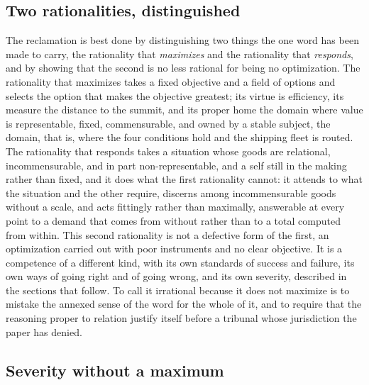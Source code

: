\subsection*{Two rationalities, distinguished}

The reclamation is best done by distinguishing two things the one word has been made to carry, the rationality that \emph{maximizes} and the rationality that \emph{responds}, and by showing that the second is no less rational for being no optimization. The rationality that maximizes takes a fixed objective and a field of options and selects the option that makes the objective greatest; its virtue is efficiency, its measure the distance to the summit, and its proper home the domain where value is representable, fixed, commensurable, and owned by a stable subject, the domain, that is, where the four conditions hold and the shipping fleet is routed. The rationality that responds takes a situation whose goods are relational, incommensurable, and in part non-representable, and a self still in the making rather than fixed, and it does what the first rationality cannot: it attends to what the situation and the other require, discerns among incommensurable goods without a scale, and acts fittingly rather than maximally, answerable at every point to a demand that comes from without rather than to a total computed from within. This second rationality is not a defective form of the first, an optimization carried out with poor instruments and no clear objective. It is a competence of a different kind, with its own standards of success and failure, its own ways of going right and of going wrong, and its own severity, described in the sections that follow. To call it irrational because it does not maximize is to mistake the annexed sense of the word for the whole of it, and to require that the reasoning proper to relation justify itself before a tribunal whose jurisdiction the paper has denied.

\subsection*{Severity without a maximum}

